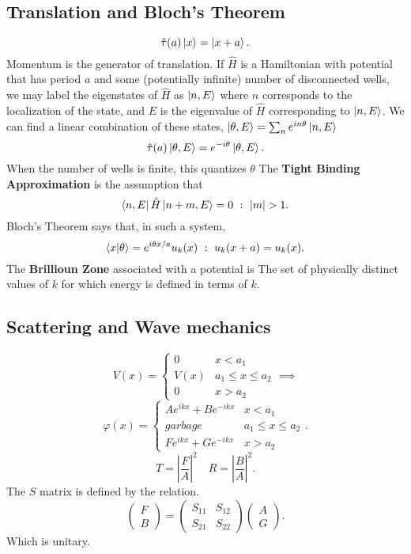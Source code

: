 \documentclass{article}
\begin{document}
    \subsection*{Translation and Bloch's Theorem}
      \[
        \hat{\tau}(a) \ket{x} = \ket{x + a}
      .\]  
      Momentum is the generator of translation. 
      If $\hat{H}$ is a Hamiltonian with potential that has period $a$
      and some (potentially infinite) number of disconnected wells, we may 
      label the eigenstates of  $\hat H$ as  $ \ket{n,E}$ where  $n$ 
      corresponds to the localization of the state, and  $E$ is the eigenvalue
      of  $\hat H $ corresponding to  $\ket{n,E}$. We can find a linear 
      combination of these states, $\ket{\theta,E} = \sum_n e^{i n \theta}\ket{n,E}$
      \[
        \hat{\tau}(a) \ket{\theta,E} = e^{-i\theta}\ket{\theta,E}
      .\] 
      When the number of wells is finite, this quantizes $\theta$
      The \textbf{Tight Binding Approximation} is the assumption that 
      \[
        \bra{n,E}\hat{H}\ket{n+m,E}=0 \,\,:\,\, |m| > 1
      .\] 
     Bloch's Theorem says that, in such a system, \[
       \bra{x}\ket{\theta}= e^{i \theta x /a}u_k(x) \,\,:\,\, u_k(x + a) = u_k(x)
     .\]  
     The \textbf{Brillioun Zone} associated with a potential is 
     The set of physically distinct values of $k$ for which energy is defined 
     in terms of  $k$.

  \subsection*{Scattering and Wave mechanics}
    \[
      V(x) = 
      \begin{cases}
        0 & x < a_1 \\
        V(x) & a_1 \leq x \leq a_2 \\
        0 & x > a_2
      \end{cases} 
      \implies 
    \]
    \[
      \varphi(x) = 
      \begin{cases}
        A e^{i k x} + B e^{-i k x} & x < a_1 \\
        garbage & a_1 \leq x \leq a_2 \\
        F e^{i k x} + G e^{-i k x} & x > a_2
      \end{cases}
    .\] 
    \[
    T = \left|\frac{F}{A}\right|^2 \quad R = \left|\frac{B}{A}\right|^2
    .\]    
   The $S$ matrix is defined by the relation.
   \[
   \begin{pmatrix}
     F \\
     B
   \end{pmatrix}
   = 
   \begin{pmatrix}
     S_{11} & S_{12} \\
     S_{21} & S_{22} 
   \end{pmatrix}
   \begin{pmatrix}
     A \\
     G
   \end{pmatrix}
   .\] 
   Which is unitary.
\end{document}
